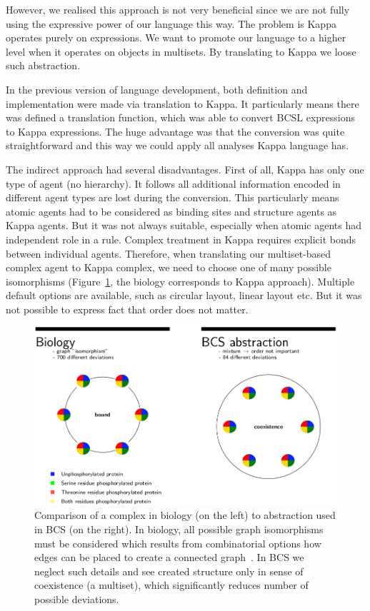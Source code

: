 \documentclass[12pt]{fithesis2}
\begin{document}
However, we realised this approach is not very beneficial since we are not fully using the expressive power of our language this way. The problem is Kappa operates purely on expressions. We want to promote our language to a higher level when it operates on objects in multisets. By translating to Kappa we loose such abstraction. 

In the previous version of language development, both definition and implementation were made via translation to Kappa. It particularly means there was defined a translation function, which was able to convert BCSL expressions to Kappa expressions. The huge advantage was that the conversion was quite straightforward and this way we could apply all analyses Kappa language has.

The indirect approach had several disadvantages. First of all, Kappa has only one type of agent (no hierarchy). It follows all additional information encoded in different agent types are lost during the conversion. This particularly means atomic agents had to be considered as binding sites and structure agents as Kappa agents. But it was not always suitable, especially when atomic agents had independent role in a rule. Complex treatment in Kappa requires explicit bonds between individual agents. Therefore, when translating our multiset-based complex agent to Kappa complex, we need to choose one of many possible isomorphisms (Figure~\ref{abstraction_comparision}, the biology corresponds to Kappa approach). Multiple default options are available, such as circular layout, linear layout etc. But it was not possible to express fact that order does not matter.

\begin{figure}[!h]
\begin{center}
  \includegraphics[scale=0.35]{pics/abstraction}
\end{center}
\caption{Comparison of a complex in biology (on the left) to abstraction used in BCS (on the right). In biology, all possible graph isomorphisms must be considered which results from combinatorial options how edges can be placed to create a connected graph~\cite{Chartrand1985}. In BCS we neglect such details and see created structure only in sense of coexistence (a multiset), which significantly reduces number of possible deviations.}\label{abstraction_comparision}
\end{figure}
\end{document}
